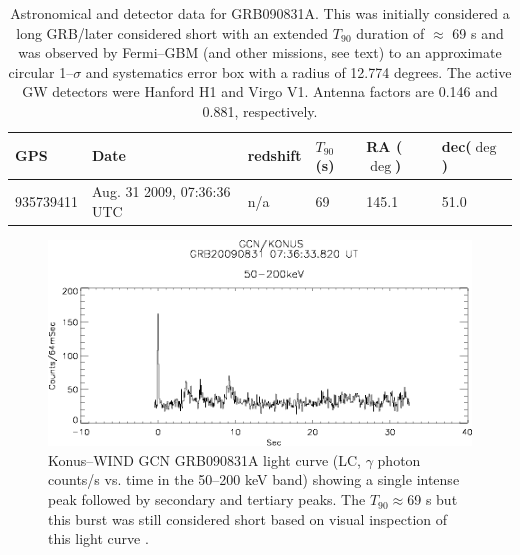 \begin{table}[ht!]
 \begin{tabular}{|l|l|l|l|l|l|}
 \hline
 \hline
 GPS & Date & redshift & $T_{90}$ (s) & RA ($\deg$) & dec($\deg$) \\
 \hline
 935739411 & Aug. 31 2009, 07:36:36 UTC & n/a & 69 & 145.1 & 51.0 \\
 \hline
 \hline
 \end{tabular}
 \caption{Astronomical and detector data for GRB090831A. This was initially considered a long GRB/later considered short with an extended $T_{90}$ duration of $\approx$ 69 s and was observed by Fermi--GBM (and other missions, see text) to an approximate circular 1--$\sigma$ and systematics error box with a radius of 12.774 degrees. The active GW detectors were Hanford H1 and Virgo V1. Antenna factors are 0.146 and 0.881, respectively.}
 \label{Table_grb090831a}
\end{table}

\begin{figure}[ht!]
\centering
\includegraphics[scale=0.80]{Images/090831a_lc.png}
\caption{Konus--WIND GCN GRB090831A light curve (LC, $\gamma$ photon counts/s vs. time in the 50--200 keV band) showing a single intense peak followed by secondary and tertiary peaks. The $T_{90} \approx$69 s but this burst was still considered short based on visual inspection of this light curve \cite{konus}.}
\label{090831a_lc}
\end{figure}

